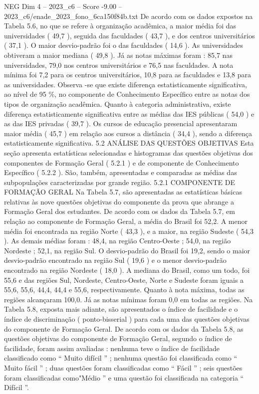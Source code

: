 \begin{textsample}{NEG Dim 4 – 2023\_c6 – Score -9.00 – 2023\_c6/enade\_2023\_fono\_6ca150f84b.txt}
De acordo com os dados expostos na Tabela 5.6, no que se refere à organização acadêmica, a maior média foi das universidades ( 49,7 ), seguida das faculdades ( 43,7 ), e dos centros universitários ( 37,1 ).
O maior desvio-padrão foi o das faculdades ( 14,6 ).
As universidades obtiveram a maior mediana ( 49,8 ).
Já as notas máximas foram : 85,7 nas universidades, 79,0 nos centros universitários e 76,5 nas faculdades.
A nota mínima foi 7,2 para os centros universitários, 10,8 para as faculdades e 13,8 para as universidades.
Observa -se que existe diferença estatisticamente significativa, ao nível de 95 \%, no componente de Conhecimento Específico entre as notas dos tipos de organização acadêmica.
Quanto à categoria administrativa, existe diferença estatisticamente significativa entre as médias das IES públicas ( 54,0 ) e as das IES privadas ( 39,7 ).
Os cursos de educação presencial apresentaram maior média ( 45,7 ) em relação aos cursos a distância ( 34,4 ), sendo a diferença estatisticamente significativa. 5.2 ANÁLISE DAS QUESTÕES OBJETIVAS Esta seção apresenta estatísticas selecionadas e histogramas das questões objetivas dos componentes de Formação Geral ( 5.2.1 ) e de componente de Conhecimento Específico ( 5.2.2 ).
São, também, apresentadas e comparadas as médias das subpopulações caracterizadas por grande região. 5.2.1 COMPONENTE DE FORMAÇÃO GERAL Na Tabela 5.7, são apresentadas as estatísticas básicas relativas às nove questões objetivas do componente da prova que abrange a Formação Geral dos estudantes.
De acordo com os dados da Tabela 5.7, em relação ao componente de Formação Geral, a média do Brasil foi 52,2.
A menor média foi encontrada na região Norte ( 43,3 ), e a maior, na região Sudeste ( 54,3 ).
As demais médias foram : 48,4, na região Centro-Oeste ; 54,0, na região Nordeste ; 52,1, na região Sul.
O desvio-padrão do Brasil foi 19,2, sendo o maior desvio-padrão encontrado na região Sul ( 19,6 ) e o menor desvio-padrão encontrado na região Nordeste ( 18,0 ).
A mediana do Brasil, como um todo, foi 55,6 e das regiões Sul, Nordeste, Centro-Oeste, Norte e Sudeste foram iguais a 55,6, 55,6, 44,4, 44,4 e 55,6, respectivamente.
Quanto à nota máxima, todas as regiões alcançaram 100,0.
Já as notas mínimas foram 0,0 em todas as regiões.
Na Tabela 5.8, exposta mais adiante, são apresentados o índice de facilidade e o índice de discriminação ( ponto-bisserial ) para cada uma das questões objetivas do componente de Formação Geral.
De acordo com os dados da Tabela 5.8, as questões objetivas do componente de Formação Geral, segundo o índice de facilidade, foram assim avaliadas : nenhuma teve o índice de facilidade classificado como “ Muito difícil ” ; nenhuma questão foi classificada como “ Muito fácil ” ; duas questões foram classificadas como “ Fácil ” ; seis questões foram classificadas como"Médio ” e uma questão foi classificada na categoria “ Difícil ”.

\end{textsample}
